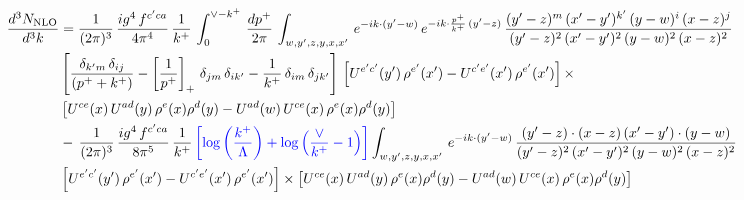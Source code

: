 \documentclass[9pt]{article}
\numberwithin{equation}{section}
\begin{document}
\begin{align}
    \frac{d^{3}N_{\rm NLO}}{d^{3}k} & = \frac{1}{(2\pi)^{3}}\, \frac{ig^{4}\,f^{c'ca}}{4\pi^{4}}\, \frac{1}{k^{+}}\,\int_{0}^{\vee-k^{+}}\, \frac{dp^{+}}{2\pi}\, \int_{w,y',z,y,x,x'}\, e^{-ik\cdot (y'-w)}\, e^{-ik\cdot \frac{p^{+}}{k^{+}}\,(y'-z)}\,\frac{(y'-z)^{m}\,(x'-y')^{k'}\,(y-w)^{i}\,(x-z)^{j}}{(y'-z)^{2}\,(x'-y')^{2}\,(y-w)^{2}\,(x-z)^{2}}\notag \\ & \left[\frac{\delta_{k'm}\,\delta_{ij}}{(p^{+}+k^{+})}-\left[\frac{1}{p^{+}}\right]_{+}\,\delta_{jm}\,\delta_{ik'}-\frac{1}{k^{+}}\, \delta_{im}\, \delta_{jk'}\right]\, \left[U^{e'c'}(y')\,\rho^{e'}(x')-U^{c'e'}(x')\,\rho^{e'}(x')\right]\times \notag \\ &  \left[U^{ce}(x)\,U^{ad}(y)\,\rho^{e}(x)\rho^{d}(y)-U^{ad}(w)\,U^{ce}(x)\,\rho^{e}(x)\rho^{d}(y)\right]\notag \\ & -\,\frac{1}{(2\pi)^{3}}\, \frac{ig^{4}\,f^{c'ca}}{8\pi^{5}}\, \frac{1}{k^{+}}\,{\color{blue}\left[\log{\left(\frac{k^{+}}{\Lambda}\right)}+\log{\left(\frac{\vee}{k^{+}}-1\right)}\right]} \int_{w,y',z,y,x,x'}\, e^{-ik\cdot (y'-w)}\,\frac{(y'-z)\cdot (x-z)\,(x'-y')\cdot (y-w)}{(y'-z)^{2}\,(x'-y')^{2}\,(y-w)^{2}\,(x-z)^{2}}\notag \\ & \left[U^{e'c'}(y')\,\rho^{e'}(x')-U^{c'e'}(x')\,\rho^{e'}(x')\right]\times  \left[U^{ce}(x)\,U^{ad}(y)\,\rho^{e}(x)\rho^{d}(y)-U^{ad}(w)\,U^{ce}(x)\,\rho^{e}(x)\rho^{d}(y)\right]
\end{align}
\end{document}
